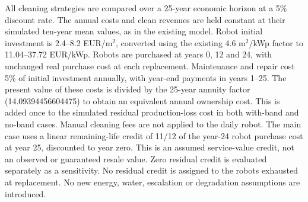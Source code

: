 All cleaning strategies are compared over a 25-year economic horizon at a 5\% discount rate. The annual costs and clean revenues are held constant at their simulated ten-year mean values, as in the existing model. Robot initial investment is 2.4--8.2 EUR/m$^2$, converted using the existing 4.6 m$^2$/kWp factor to 11.04--37.72 EUR/kWp. Robots are purchased at years 0, 12 and 24, with unchanged real purchase cost at each replacement. Maintenance and repair cost 5\% of initial investment annually, with year-end payments in years 1--25. The present value of these costs is divided by the 25-year annuity factor (14.09394456604475) to obtain an equivalent annual ownership cost. This is added once to the simulated residual production-loss cost in both with-band and no-band cases. Manual cleaning fees are not applied to the daily robot. The main case uses a linear remaining-life credit of 11/12 of the year-24 robot purchase cost at year 25, discounted to year zero. This is an assumed service-value credit, not an observed or guaranteed resale value. Zero residual credit is evaluated separately as a sensitivity. No residual credit is assigned to the robots exhausted at replacement. No new energy, water, escalation or degradation assumptions are introduced.
